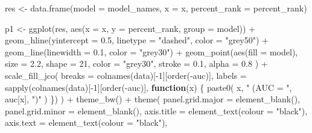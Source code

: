 \documentclass[
  11pt,
  oneside]{book}
\newenvironment{Shaded}{\begin{snugshade}}{\end{snugshade}}
\newcommand{\AttributeTok}[1]{\textcolor[rgb]{0.77,0.63,0.00}{#1}}
\newcommand{\ControlFlowTok}[1]{\textcolor[rgb]{0.13,0.29,0.53}{\textbf{#1}}}
\newcommand{\DecValTok}[1]{\textcolor[rgb]{0.00,0.00,0.81}{#1}}
\newcommand{\FloatTok}[1]{\textcolor[rgb]{0.00,0.00,0.81}{#1}}
\newcommand{\FunctionTok}[1]{\textcolor[rgb]{0.00,0.00,0.00}{#1}}
\newcommand{\NormalTok}[1]{#1}
\newcommand{\OtherTok}[1]{\textcolor[rgb]{0.56,0.35,0.01}{#1}}
\newcommand{\SpecialCharTok}[1]{\textcolor[rgb]{0.00,0.00,0.00}{#1}}
\newcommand{\StringTok}[1]{\textcolor[rgb]{0.31,0.60,0.02}{#1}}
\begin{document}
\begin{Shaded}
\begin{Highlighting}[]
\NormalTok{res }\OtherTok{\textless{}{-}} \FunctionTok{data.frame}\NormalTok{(}\AttributeTok{model =}\NormalTok{ model\_names, }\AttributeTok{x =}\NormalTok{ x, }\AttributeTok{percent\_rank =}\NormalTok{ percent\_rank)}

\NormalTok{p1 }\OtherTok{\textless{}{-}} \FunctionTok{ggplot}\NormalTok{(res, }\FunctionTok{aes}\NormalTok{(}\AttributeTok{x =}\NormalTok{ x, }\AttributeTok{y =} \StringTok{\textasciigrave{}}\AttributeTok{percent\_rank}\StringTok{\textasciigrave{}}\NormalTok{, }\AttributeTok{group =}\NormalTok{ model)) }\SpecialCharTok{+}
  \FunctionTok{geom\_hline}\NormalTok{(}\AttributeTok{yintercept =} \FloatTok{0.5}\NormalTok{, }\AttributeTok{linetype =} \StringTok{"dashed"}\NormalTok{, }\AttributeTok{color =} \StringTok{"grey50"}\NormalTok{) }\SpecialCharTok{+}
  \FunctionTok{geom\_line}\NormalTok{(}\AttributeTok{linewidth =} \FloatTok{0.1}\NormalTok{, }\AttributeTok{color =} \StringTok{"grey30"}\NormalTok{) }\SpecialCharTok{+}
  \FunctionTok{geom\_point}\NormalTok{(}\FunctionTok{aes}\NormalTok{(}\AttributeTok{fill =}\NormalTok{ model),}
    \AttributeTok{size =} \FloatTok{2.2}\NormalTok{, }\AttributeTok{shape =} \DecValTok{21}\NormalTok{, }\AttributeTok{color =} \StringTok{"grey30"}\NormalTok{, }\AttributeTok{stroke =} \FloatTok{0.1}\NormalTok{,}
    \AttributeTok{alpha =} \FloatTok{0.8}
\NormalTok{  ) }\SpecialCharTok{+}
  \FunctionTok{scale\_fill\_jco}\NormalTok{(}
    \AttributeTok{breaks =} \FunctionTok{colnames}\NormalTok{(data)[}\SpecialCharTok{{-}}\DecValTok{1}\NormalTok{][}\FunctionTok{order}\NormalTok{(}\SpecialCharTok{{-}}\NormalTok{auc)],}
    \AttributeTok{labels =} \FunctionTok{sapply}\NormalTok{(}\FunctionTok{colnames}\NormalTok{(data)[}\SpecialCharTok{{-}}\DecValTok{1}\NormalTok{][}\FunctionTok{order}\NormalTok{(}\SpecialCharTok{{-}}\NormalTok{auc)], }\ControlFlowTok{function}\NormalTok{(x) \{}
      \FunctionTok{paste0}\NormalTok{(}
\NormalTok{        x, }\StringTok{" (AUC = "}\NormalTok{,}
\NormalTok{        auc[x], }\StringTok{")"}
\NormalTok{      )}
\NormalTok{    \})}
\NormalTok{  ) }\SpecialCharTok{+}
  \FunctionTok{theme\_bw}\NormalTok{() }\SpecialCharTok{+}
  \FunctionTok{theme}\NormalTok{(}
    \AttributeTok{panel.grid.major =} \FunctionTok{element\_blank}\NormalTok{(),}
    \AttributeTok{panel.grid.minor =} \FunctionTok{element\_blank}\NormalTok{(),}
    \AttributeTok{axis.title =} \FunctionTok{element\_text}\NormalTok{(}\AttributeTok{colour =} \StringTok{"black"}\NormalTok{),}
    \AttributeTok{axis.text =} \FunctionTok{element\_text}\NormalTok{(}\AttributeTok{colour =} \StringTok{"black"}\NormalTok{),}

\end{Highlighting}
\end{Shaded}
\end{document}
